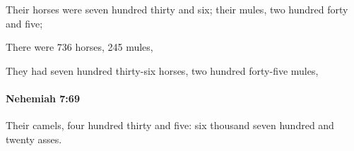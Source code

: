 			\begin{versebox}
					\item[BHS] 
					\item[ASV] Their horses were seven hundred thirty and six; their mules, two hundred forty and five;
					\item[NIV] There were 736 horses, 245 mules,
					\item[NRSV] They had seven hundred thirty-six horses, two hundred forty-five mules,
			\end{versebox}

		\paragraph{Nehemiah 7:69} %
			\label{NEHEMIAH-7-69}

			Their camels, four hundred thirty and five: six thousand seven hundred and twenty asses.

